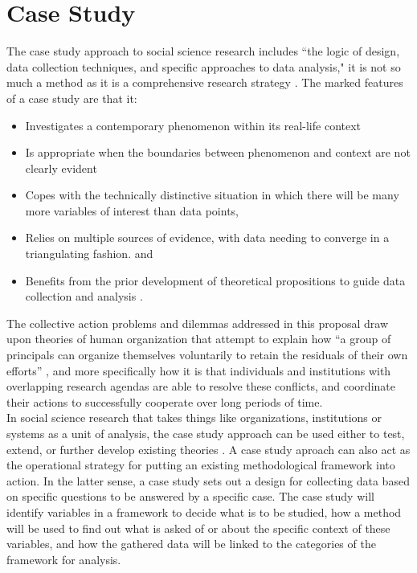 \documentclass[thesis,tocnosub,noragright,centerchapter,12pt]{uiucecethesis09}
\begin{document}
{\section{Case Study}

The case study approach to social science research includes ``the logic
of design, data collection techniques, and specific approaches to data
analysis," it is not so much a method as it is a comprehensive research
strategy \citep[p. 14]{yin2003case}. The marked features of a case study are that
it:\\

\begin{itemize}
\itemsep1pt\parskip0pt
\item
  Investigates a contemporary phenomenon within its real-life context
\item
  Is appropriate when the boundaries between phenomenon and context are
  not clearly evident
\item
  Copes with the technically distinctive situation in which there will
  be many more variables of interest than data points,
\item
  Relies on multiple sources of evidence, with data needing to converge
  in a triangulating fashion. and
\item
  Benefits from the prior development of theoretical propositions to
  guide data collection and analysis \citep[Quoted from][]{yin2014case}.
\end{itemize}

The collective action problems and dilemmas addressed in this proposal
draw upon theories of human organization that attempt to explain how ``a
group of principals can organize themselves voluntarily to retain the
residuals of their own efforts'' \citeyearpar[p. 25]{ostrom1990governing}, and more
specifically how it is that individuals and institutions with
overlapping research agendas are able to resolve these conflicts, and
coordinate their actions to successfully cooperate over long periods of
time.\\

In social science research that takes things like organizations,
institutions or systems as a unit of analysis, the case study approach
can be used either to test, extend, or further develop existing theories \citep{stake1995art}. A case study aproach can also act as the operational strategy for putting an existing methodological framework into action. In the latter sense, a case study sets out a design for collecting data based on specific questions to be answered by a specific case. The case study will identify variables in a framework to decide what is to be studied, how a method will be used to find out what is asked of or about the specific context of these variables, and how the gathered data will be linked to the categories of
the framework for analysis.\\

}
\end{document}
